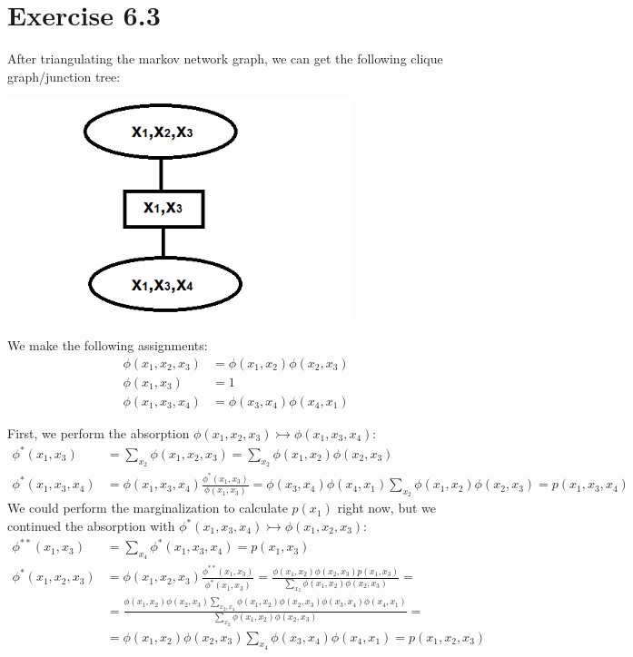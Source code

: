 \documentclass[11pt,a4paper,oneside]{report}
\begin{document}
\section*{Exercise 6.3}

After triangulating the markov network graph, we can get the following clique graph/junction tree:
	\begin{center} \includegraphics[width=0.75\textwidth]{c6e3junction}\end{center}  

We make the following assignments:
\begin{align*}
\phi(x_1,x_2,x_3) &= \phi(x_1,x_2)\phi(x_2,x_3)\\
\phi(x_1,x_3) &= 1\\
\phi(x_1,x_3,x_4) &= \phi(x_3,x_4)\phi(x_4,x_1)
\end{align*}

First, we perform the absorption $\phi(x_1,x_2,x_3)\rightarrowtail\phi(x_1,x_3,x_4)$:
\begin{align*}
\phi^\ast(x_1,x_3) &=\sum_{x_2}\phi(x_1,x_2,x_3)=\sum_{x_2}\phi(x_1,x_2)\phi(x_2,x_3) \\
\phi^\ast(x_1,x_3,x_4) &= \phi(x_1,x_3,x_4)\frac{\phi^\ast(x_1,x_3)}{\phi(x_1,x_3)}=\phi(x_3,x_4)\phi(x_4,x_1)\sum_{x_2}\phi(x_1,x_2)\phi(x_2,x_3)=p(x_1,x_3,x_4)
\end{align*}
We could perform the marginalization to calculate $p(x_1)$ right now, but we continued the absorption with $\phi^\ast(x_1,x_3,x_4)\rightarrowtail\phi(x_1,x_2,x_3)$:
\begin{align*}
\phi^{\ast\ast}(x_1,x_3) &=\sum_{x_4}\phi^\ast(x_1,x_3,x_4)=p(x_1,x_3) \\
\phi^\ast(x_1,x_2,x_3) &= \phi(x_1,x_2,x_3)\frac{\phi^{\ast\ast}(x_1,x_3)}{\phi^\ast(x_1,x_3)}=\frac{\phi(x_1,x_2)\phi(x_2,x_3)p(x_1,x_3)}{\sum_{x_2}\phi(x_1,x_2)\phi(x_2,x_3)}=\\
&=\frac{\phi(x_1,x_2)\phi(x_2,x_3)\sum_{x_2,x_4}\phi(x_1,x_2)\phi(x_2,x_3)\phi(x_3,x_4)\phi(x_4,x_1)}{\sum_{x_2}\phi(x_1,x_2)\phi(x_2,x_3)}=\\
&=\phi(x_1,x_2)\phi(x_2,x_3)\sum_{x_4}\phi(x_3,x_4)\phi(x_4,x_1)=p(x_1,x_2,x_3)
\end{align*}
\end{document}
